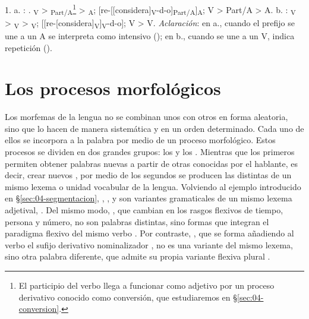 \begin{ejercicio}
\begin{resuelto}
1. a. : .
\textsubscript{V} >
\textsubscript{Part/A}\footnote{El participio del verbo llega
a funcionar como adjetivo por un proceso derivativo conocido como conversión,
que estudiaremos en §\ref{sec:04-conversion}.} >
\textsubscript{A};
[re-[[considera]\textsubscript{V}-d-o]\textsubscript{Part/A}]\textsubscript{A}; V >
Part/A > A. b. :
\textsubscript{V} > \textsubscript{V} >
\textsubscript{V};
[[re-[considera]\textsubscript{V}]\textsubscript{V}-d-o]; V > V.
\textit{Aclaración}: en a., cuando el prefijo  se une a un A se
interpreta como intensivo (); en b., cuando se une a un V, indica
repetición ().
\end{resuelto}
\end{ejercicio}

\section{Los procesos morfológicos}

Los morfemas de la lengua no se combinan unos con otros en forma aleatoria, sino
que lo hacen de manera sistemática y en un orden determinado. Cada uno de ellos
se incorpora a la palabra por medio de un proceso morfológico. Estos procesos se
dividen en dos grandes grupos: los  y los . Mientras que los primeros permiten
obtener palabras nuevas a partir de otras conocidas por el hablante, es decir,
crear nuevos , por medio de los segundos se producen las
distintas  de un mismo lexema o unidad
vocabular de la lengua. Volviendo al ejemplo introducido en
§\ref{sec:04-segmentacion}, , ,
 y  son variantes gramaticales de un mismo
lexema adjetival, . Del mismo modo, , que cambian en los rasgos flexivos de tiempo,
persona y número, no son palabras distintas, sino formas que integran el
paradigma flexivo del mismo verbo . Por contraste,
, que se forma añadiendo al verbo el sufijo derivativo
nominalizador , no es una variante del mismo lexema, sino otra
palabra diferente, que admite su propia variante flexiva plural
.

